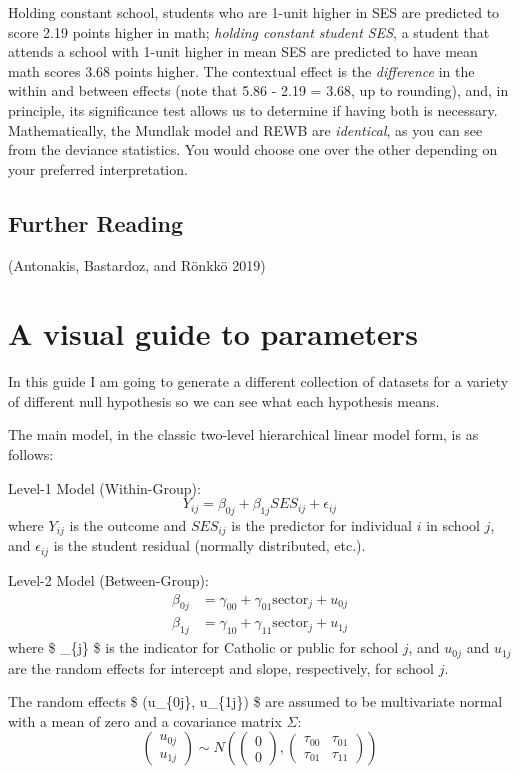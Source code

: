 \documentclass[
  letterpaper,
  DIV=11,
  numbers=noendperiod]{scrreprt}
\begin{document}
Holding constant school, students who are 1-unit higher in SES are
predicted to score 2.19 points higher in math; \emph{holding constant
student SES}, a student that attends a school with 1-unit higher in mean
SES are predicted to have mean math scores 3.68 points higher. The
contextual effect is the \emph{difference} in the within and between
effects (note that 5.86 - 2.19 = 3.68, up to rounding), and, in
principle, its significance test allows us to determine if having both
is necessary. Mathematically, the Mundlak model and REWB are
\emph{identical}, as you can see from the deviance statistics. You would
choose one over the other depending on your preferred interpretation.

\section{Further Reading}\label{further-reading-1}

(Antonakis, Bastardoz, and Rönkkö 2019)

\chapter{A visual guide to
parameters}\label{a-visual-guide-to-parameters}

In this guide I am going to generate a different collection of datasets
for a variety of different null hypothesis so we can see what each
hypothesis means.

The main model, in the classic two-level hierarchical linear model form,
is as follows:

Level-1 Model (Within-Group): \[
Y_{ij} = \beta_{0j} + \beta_{1j} SES_{ij} + \epsilon_{ij}
\] where \(Y_{ij}\) is the outcome and \(SES_{ij}\) is the predictor for
individual \(i\) in school \(j\), and \(\epsilon_{ij}\) is the student
residual (normally distributed, etc.).

Level-2 Model (Between-Group): \[
\begin{aligned}
\beta_{0j} &= \gamma_{00} + \gamma_{01} \text{sector}_{j} + u_{0j} \\
\beta_{1j} &= \gamma_{10} + \gamma_{11} \text{sector}_{j} + u_{1j}
\end{aligned}
\] where \$ \_\{j\} \$ is the indicator for Catholic or
public for school \(j\), and \(u_{0j}\) and \(u_{1j}\) are the random
effects for intercept and slope, respectively, for school \(j\).

The random effects \$ (u\_\{0j\}, u\_\{1j\}) \$ are assumed to be
multivariate normal with a mean of zero and a covariance matrix
\(\Sigma\): \[
\begin{pmatrix}
u_{0j} \\
u_{1j}
\end{pmatrix}
\sim N \left(
\begin{pmatrix}
0 \\
0
\end{pmatrix},
\begin{pmatrix}
\tau_{00} & \tau_{01} \\
\tau_{01} & \tau_{11}
\end{pmatrix}
\right)
\]
\end{document}
